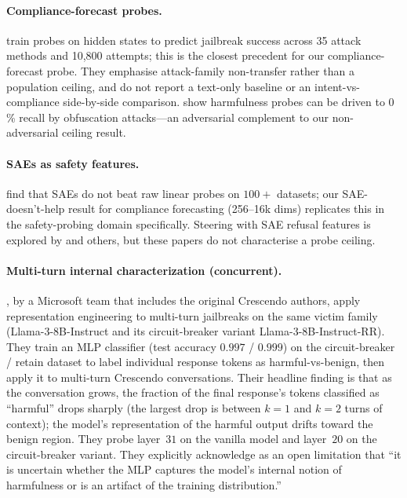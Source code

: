 \documentclass[11pt]{article}
\begin{document}
\paragraph{Compliance-forecast probes.}
\citet{kirch2024features} train probes on hidden states to predict jailbreak success across 35 attack methods and 10{,}800 attempts; this is the closest precedent for our compliance-forecast probe. They emphasise attack-family non-transfer rather than a population ceiling, and do not report a text-only baseline or an intent-vs-compliance side-by-side comparison. \citet{bailey2024obfuscated} show harmfulness probes can be driven to $0$\% recall by obfuscation attacks---an adversarial complement to our non-adversarial ceiling result.

\paragraph{SAEs as safety features.}
\citet{karvonen2025saes} find that SAEs do not beat raw linear probes on $100+$ datasets; our SAE-doesn't-help result for compliance forecasting (256--16k dims) replicates this in the safety-probing domain specifically. Steering with SAE refusal features is explored by \citet{obrien2024steering} and others, but these papers do not characterise a probe ceiling.

\paragraph{Multi-turn internal characterization (concurrent).}
\citet{bullwinkel2025multiturnrep}, by a Microsoft team that includes the original Crescendo authors, apply representation engineering to multi-turn jailbreaks on the same victim family (Llama-3-8B-Instruct and its circuit-breaker variant Llama-3-8B-Instruct-RR). They train an MLP classifier (test accuracy $0.997$ / $0.999$) on the circuit-breaker / retain dataset to label individual response tokens as harmful-vs-benign, then apply it to multi-turn Crescendo conversations. Their headline finding is that as the conversation grows, the fraction of the final response's tokens classified as ``harmful'' drops sharply (the largest drop is between $k{=}1$ and $k{=}2$ turns of context); the model's representation of the harmful output drifts toward the benign region. They probe layer~$31$ on the vanilla model and layer~$20$ on the circuit-breaker variant. They explicitly acknowledge as an open limitation that ``it is uncertain whether the MLP captures the model's internal notion of harmfulness or is an artifact of the training distribution.''
\end{document}
